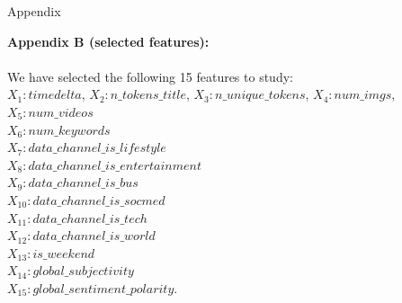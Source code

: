 \documentclass[a4paper,11pt]{article}
\begin{document}
\begin{section}{Appendix}
   
\textbf{Appendix B (selected features):}\\\\
We have selected the following 15 features to study:\\
 $X_1: timedelta$,                     $X_2: n\_tokens\_title$,                $X_3: n\_unique\_tokens$,               $X_4: num\_imgs$,                     
  $X_5: num\_videos$\\                    $X_6: num\_keywords$\\                  $X_7: data\_channel\_is\_lifestyle$\\     $X_8: data\_channel\_is\_entertainment$\\
  $X_9: data\_channel\_is\_bus$\\           $X_{10}: data\_channel\_is\_socmed$\\        $X_{11}: data\_channel\_is\_tech$\\         $X_{12}: data\_channel\_is\_world$\\        
 $X_{13}: is\_weekend$\\                    $X_{14}: global\_subjectivity$\\           $X_{15}: global\_sentiment\_polarity$.\\\\


\end{section}
\end{document}
